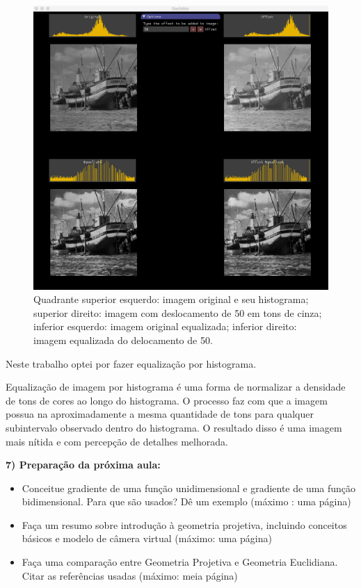 \documentclass[a4paper]{sbgames}               %
\begin{document}
\begin{figure} [h!]
  \centering 
  \includegraphics[width=0.95\linewidth]{imgs/equalized}
 \caption{Quadrante superior esquerdo: imagem original e seu histograma; superior direito: imagem com deslocamento de 50 em tons de cinza; inferior esquerdo: imagem original equalizada; inferior direito: imagem equalizada do delocamento de 50. } 
 \label{fig:burstgoogle} 
\end{figure}

Neste trabalho optei por fazer equalização por histograma.

Equalização de imagem por histograma é uma forma de normalizar a densidade de tons de cores ao longo do histograma. O processo faz com que a imagem possua na aproximadamente a mesma quantidade de tons para qualquer subintervalo observado dentro do histograma. O resultado disso é uma imagem mais nítida e com percepção de detalhes melhorada. 

\textbf{7) Preparação da próxima aula:}
\begin{itemize}
\item Conceitue gradiente de uma função unidimensional e gradiente de uma função bidimensional. Para que são usados? Dê um exemplo (máximo :
uma página)
\item Faça um resumo sobre introdução à geometria projetiva, incluindo
conceitos básicos e modelo de câmera virtual (máximo: uma página)
\item Faça uma comparação entre Geometria Projetiva e Geometria Euclidiana.
Citar as referências usadas (máximo: meia página)
\end{itemize}



\end{document}
